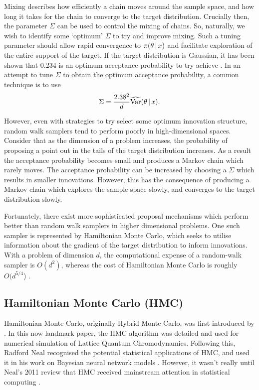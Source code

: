 Mixing describes how efficiently a chain moves around the sample space, and how long it
takes for the chain to converge to the target distribution.  Crucially then, the parameter
$\Sigma$ can be used to control the mixing of chains. So, naturally, we wish to identify
some `optimum' $\Sigma$ to try and improve mixing. Such a tuning parameter should allow
rapid convergence to $\pi(\theta \,|\,  x)$ and facilitate exploration of the entire
support of the target. If the target distribution is Gaussian, it has been shown that
$0.234$ is an optimum acceptance probability to try achieve \parencite{roberts01}. In an
attempt to tune $\Sigma$ to obtain the optimum acceptance probability, a common technique
is to use
\begin{equation*}
 \Sigma = \frac{2.38^2}{d} \widehat{\text{Var}}(\theta \,|\, x).
\end{equation*}

However, even with strategies to try select some optimum innovation structure, random walk
samplers tend to perform poorly in high-dimensional spaces. Consider that as the
dimension of a problem increases, the probability of proposing a point out in the tails of
the target distribution increases. As a result the acceptance probability becomes small and
produces a Markov chain which rarely moves. The acceptance probability can be increased
by choosing a $\Sigma$ which results in smaller innovations. However, this has the
consequence of producing a Markov chain which explores the sample space slowly, and
converges to the target distribution slowly.

Fortunately, there exist more sophisticated proposal mechanisms which perform better than
random walk samplers in higher dimensional problems. One such sampler is represented by
Hamiltonian Monte Carlo, which seeks to utilise information about the gradient of the
target distribution to inform innovations. With a problem of dimension $d$, the
computational expense of a random-walk sampler is $O(d^2)$, whereas the cost of
Hamiltonian Monte Carlo is roughly $O(d^{5/4}$) \parencite{creutz88}. 

\subsection{Hamiltonian Monte Carlo (HMC)}

Hamiltonian Monte Carlo, originally Hybrid Monte Carlo, was first introduced by
\textcite{duane87}. In this now landmark paper, the HMC algorithm was detailed and used
for numerical simulation of Lattice Quantum Chromodynamics. Following this, Radford Neal
recognised the potential statistical applications of HMC, and used it in his work on
Bayesian neural network models \parencite{neal95}. However, it wasn't really until Neal's
2011 review \parencite{neal11} that HMC received mainstream attention in statistical
computing \parencite{betancourt18}.

